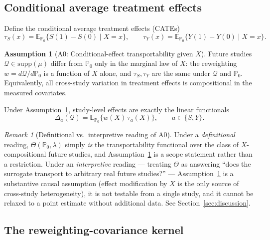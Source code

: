 \documentclass[11pt]{article}
\theoremstyle{plain}
\theoremstyle{definition}
\newtheorem{assumption}{Assumption}
\theoremstyle{remark}
\newtheorem{remark}[theorem]{Remark}
\newcommand{\E}{\mathbb{E}}
\newcommand{\PP}{\mathbb{P}}
\newcommand{\Q}{\mathcal{Q}}
\begin{document}
\subsection{Conditional average treatment effects}

Define the conditional average treatment effects (CATEs)
\begin{equation}\label{eq:cate}
    \tau_S(x) = \E_{\PP_0}\{S(1)-S(0)\mid X=x\}, \qquad
    \tau_Y(x) = \E_{\PP_0}\{Y(1)-Y(0)\mid X=x\}.
\end{equation}

\begin{assumption}[A0: Conditional-effect transportability given $X$]\label{ass:A0}
Future studies $\Q\in\mathrm{supp}(\mu)$ differ from $\PP_0$ only in the marginal law of
$X$: the reweighting $w=d\Q/d\PP_0$ is a function of $X$ alone, and $\tau_S,\tau_Y$ are
the same under $\Q$ and $\PP_0$. Equivalently, all cross-study variation in treatment
effects is compositional in the measured covariates.
\end{assumption}

Under Assumption~\ref{ass:A0}, study-level effects are exactly the linear functionals
\begin{equation}\label{eq:delta-linear}
    \Delta_a(\Q) = \E_{\PP_0}\{w(X)\,\tau_a(X)\}, \qquad a\in\{S,Y\}.
\end{equation}

\begin{remark}[Definitional vs.\ interpretive reading of A0]\label{rem:A0-reading}
Under a \emph{definitional} reading, $\Theta(\PP_0,\lambda)$ simply \emph{is} the
transportability functional over the class of $X$-compositional future studies, and
Assumption~\ref{ass:A0} is a scope statement rather than a restriction. Under an
\emph{interpretive} reading --- treating $\Theta$ as answering ``does the surrogate
transport to arbitrary real future studies?'' --- Assumption~\ref{ass:A0} is a
substantive causal assumption (effect modification by $X$ is the only source of
cross-study heterogeneity), it is not testable from a single study, and it cannot be
relaxed to a point estimate without additional data. See
Section~\ref{sec:discussion}.
\end{remark}

\subsection{The reweighting-covariance kernel}
\end{document}
